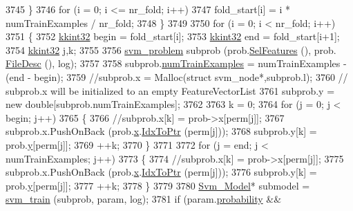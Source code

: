 \begin{DoxyCode}
3745     \}
3746     \textcolor{keywordflow}{for}  (i = 0;  i <=  nr\_fold; i++)
3747       fold\_start[i] = i * numTrainExamples / nr\_fold;
3748   \}
3749 
3750   \textcolor{keywordflow}{for}  (i = 0;  i < nr\_fold;  i++)
3751   \{
3752     \hyperlink{namespace_k_k_b_a8fa4952cc84fda1de4bec1fbdd8d5b1b}{kkint32} begin = fold\_start[i];
3753     \hyperlink{namespace_k_k_b_a8fa4952cc84fda1de4bec1fbdd8d5b1b}{kkint32} end = fold\_start[i+1];
3754     \hyperlink{namespace_k_k_b_a8fa4952cc84fda1de4bec1fbdd8d5b1b}{kkint32} j,k;
3755 
3756     \hyperlink{struct_s_v_m289___m_f_s_1_1svm__problem}{svm\_problem}  subprob (prob.\hyperlink{struct_s_v_m289___m_f_s_1_1svm__problem_abf41e96f4e6b9af73afab424460b53da}{SelFeatures} (), prob.
      \hyperlink{struct_s_v_m289___m_f_s_1_1svm__problem_a4b0a7bee7be16b685372bc6d2cfcda8d}{FileDesc} (), log);
3757 
3758     subprob.\hyperlink{struct_s_v_m289___m_f_s_1_1svm__problem_a16d137e053c79776e064691a20fa80ee}{numTrainExamples} = numTrainExamples - (end - begin);
3759     \textcolor{comment}{//subprob.x = Malloc(struct svm\_node*,subprob.l);}
3760     \textcolor{comment}{// subprob.x  will be initialized to an empty FeatureVectorList }
3761     subprob.y = \textcolor{keyword}{new} \textcolor{keywordtype}{double}[subprob.numTrainExamples];
3762       
3763     k = 0;
3764     \textcolor{keywordflow}{for}  (j = 0;  j < begin;  j++)
3765     \{
3766       \textcolor{comment}{//subprob.x[k] = prob->x[perm[j]];}
3767       subprob.x.PushOnBack (prob.\hyperlink{struct_s_v_m289___m_f_s_1_1svm__problem_a7bca932b51ca89f6820225e8e9c1bd35}{x}.\hyperlink{class_k_k_b_1_1_k_k_queue_acce2bdd8b3327e38266cf198382cd852}{IdxToPtr} (perm[j]));
3768       subprob.y[k] = prob.\hyperlink{struct_s_v_m289___m_f_s_1_1svm__problem_a56cf75f3e15322e1928a8294f9a55d2a}{y}[perm[j]];
3769       ++k;
3770     \}
3771 
3772     \textcolor{keywordflow}{for}  (j = end;  j < numTrainExamples;  j++)
3773     \{
3774       \textcolor{comment}{//subprob.x[k] = prob->x[perm[j]];}
3775       subprob.x.PushOnBack (prob.\hyperlink{struct_s_v_m289___m_f_s_1_1svm__problem_a7bca932b51ca89f6820225e8e9c1bd35}{x}.\hyperlink{class_k_k_b_1_1_k_k_queue_acce2bdd8b3327e38266cf198382cd852}{IdxToPtr} (perm[j]));
3776       subprob.y[k] = prob.\hyperlink{struct_s_v_m289___m_f_s_1_1svm__problem_a56cf75f3e15322e1928a8294f9a55d2a}{y}[perm[j]];
3777       ++k;
3778     \}
3779 
3780     \hyperlink{struct_s_v_m289___m_f_s_1_1_svm___model}{Svm\_Model}*  submodel = \hyperlink{namespace_s_v_m233_a0f6331f1d29cc73bc32f39c104b8d74c}{svm\_train} (subprob, param, log);
3781     \textcolor{keywordflow}{if}  (param.\hyperlink{struct_s_v_m289___m_f_s_1_1svm__parameter_a34eba918ae65f56f3186bbdeae8ccd4b}{probability} && 

\end{DoxyCode}

